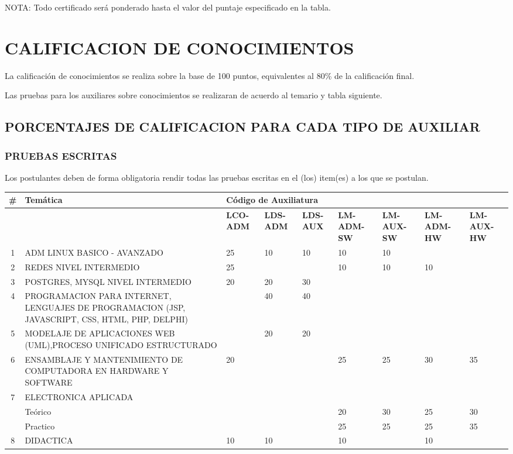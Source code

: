 \documentclass[letterpaper,11pt]{article}
\begin{document}
NOTA: Todo certificado será ponderado hasta el valor del puntaje especificado en la tabla.

\section{CALIFICACION DE CONOCIMIENTOS}
La calificación de conocimientos se realiza sobre la base de 100 puntos, equivalentes al 80\% de la calificación final.

Las pruebas para los auxiliares sobre conocimientos se realizaran de acuerdo al temario y tabla siguiente.

\subsection{PORCENTAJES DE CALIFICACION PARA CADA TIPO DE AUXILIAR}
\subsubsection{PRUEBAS ESCRITAS}
Los postulantes deben de forma obligatoria rendir todas las pruebas escritas en el (los) item(es) a los que se postulan.

\begin{tabular}{|c|p{5.8cm}|p{0.8cm}|p{0.8cm}|p{0.8cm}|p{0.8cm}|p{0.8cm}|p{0.8cm}|p{0.8cm}|}
\hline
 \textbf{\#  } & \textbf{Temática} & \multicolumn{7}{|l|}{\textbf{Código de Auxiliatura}} \\
\hline
  &  & \textbf{\textbf{LCO-ADM}} & \textbf{LDS-ADM} & \textbf{LDS-AUX} & \textbf{LM-ADM-SW} & \textbf{LM-AUX-SW} & \textbf{LM-ADM-HW} & \textbf{LM-AUX-HW} \\
\hline
 1 & ADM LINUX BASICO - AVANZADO & 25 & 10 & 10 & 10 & 10 &  &  \\
\hline
 2 & REDES NIVEL INTERMEDIO & 25 &  &  & 10 & 10 & 10 &  \\
\hline
 3 & POSTGRES, MYSQL NIVEL INTERMEDIO & 20 & 20 & 30 &  &  &  &  \\
\hline
 4 & PROGRAMACION PARA INTERNET, LENGUAJES DE PROGRAMACION (JSP, JAVASCRIPT, CSS, HTML, PHP, DELPHI) &  & 40 & 40 &  &  &  &  \\
\hline
 5 & MODELAJE DE APLICACIONES WEB (UML),PROCESO UNIFICADO ESTRUCTURADO &  & 20 & 20 &  &  &  &  \\
\hline
 6 & ENSAMBLAJE Y MANTENIMIENTO DE COMPUTADORA EN HARDWARE Y SOFTWARE & 20 &  &  & 25 & 25 & 30 & 35 \\
\hline
 7 & ELECTRONICA APLICADA & \multicolumn{7}{|l|}{} \\
\hline
  & Teórico &  &  &  & 20 & 30 & 25 & 30 \\
\hline
  & Practico &  &  &  & 25 & 25 & 25 & 35 \\
\hline
 8 & DIDACTICA & 10 & 10 &  & 10 &  & 10 &  \\
\hline
\end{tabular}
\end{document}
